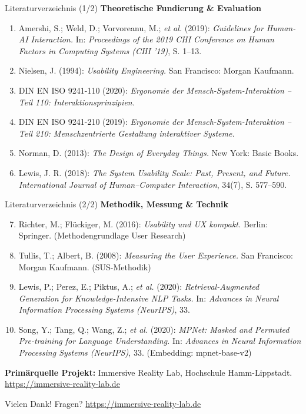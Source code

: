 \documentclass[14pt,aspectratio=169]{beamer}
\begin{document}
\begin{frame}[t]{Literaturverzeichnis (1/2)}
    \footnotesize
    \textbf{Theoretische Fundierung \& Evaluation}
    \vspace{0.2cm}

    \begin{enumerate}
        \setlength{\itemsep}{0.35em}
        \item Amershi, S.; Weld, D.; Vorvoreanu, M.; \emph{et al.} (2019): \emph{Guidelines for Human-AI Interaction.} In: \emph{Proceedings of the 2019 CHI Conference on Human Factors in Computing Systems (CHI '19)}, S. 1--13.
        \item Nielsen, J. (1994): \emph{Usability Engineering.} San Francisco: Morgan Kaufmann.
        \item DIN EN ISO 9241-110 (2020): \emph{Ergonomie der Mensch-System-Interaktion -- Teil 110: Interaktionsprinzipien.}
        \item DIN EN ISO 9241-210 (2019): \emph{Ergonomie der Mensch-System-Interaktion -- Teil 210: Menschzentrierte Gestaltung interaktiver Systeme.}
        \item Norman, D. (2013): \emph{The Design of Everyday Things.} New York: Basic Books.
        \item Lewis, J. R. (2018): \emph{The System Usability Scale: Past, Present, and Future.} \emph{International Journal of Human--Computer Interaction}, 34(7), S. 577--590.
    \end{enumerate}
\end{frame}

\begin{frame}[t]{Literaturverzeichnis (2/2)}
    \footnotesize
    \textbf{Methodik, Messung \& Technik}
    \vspace{0.2cm}

    \begin{enumerate}
        \setcounter{enumi}{6}
        \setlength{\itemsep}{0.35em}
        \item Richter, M.; Flückiger, M. (2016): \emph{Usability und UX kompakt.} Berlin: Springer. {\footnotesize (Methodengrundlage User Research)}
        \item Tullis, T.; Albert, B. (2008): \emph{Measuring the User Experience.} San Francisco: Morgan Kaufmann. {\footnotesize (SUS-Methodik)}
        \item Lewis, P.; Perez, E.; Piktus, A.; \emph{et al.} (2020): \emph{Retrieval-Augmented Generation for Knowledge-Intensive NLP Tasks.} In: \emph{Advances in Neural Information Processing Systems (NeurIPS)}, 33.
        \item Song, Y.; Tang, Q.; Wang, Z.; \emph{et al.} (2020): \emph{MPNet: Masked and Permuted Pre-training for Language Understanding.} In: \emph{Advances in Neural Information Processing Systems (NeurIPS)}, 33. {\footnotesize (Embedding: mpnet-base-v2)}
    \end{enumerate}

    \vspace{0.3cm}
    \small
    \textbf{Primärquelle Projekt:} Immersive Reality Lab, Hochschule Hamm-Lippstadt. \url{https://immersive-reality-lab.de}
\end{frame}

\begin{frame}{Vielen Dank!}
    \centering
    \vspace{1cm}
    \Huge Fragen?
    \vspace{1cm}
    \normalsize
    \url{https://immersive-reality-lab.de}
\end{frame}
\end{document}

